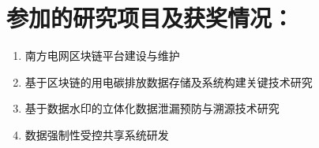 

\section*{参加的研究项目及获奖情况：}
\begin{enumerate}[nosep]
    \item 南方电网区块链平台建设与维护
    \item 基于区块链的用电碳排放数据存储及系统构建关键技术研究
    \item 基于数据水印的立体化数据泄漏预防与溯源技术研究
    \item 数据强制性受控共享系统研发
\end{enumerate}

\cleardoublepage[plain]%
